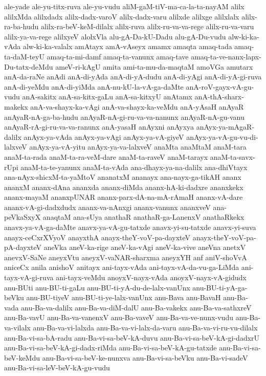 {ale-yade
ale-yu-titx-ruva
ale-yu-vudu
aliM-gaM-tiV-ma-ca-la-ta-nayAM
alilx
alilxMda
alilxdadx
alilx-dadx-varoV
alilx-dadx-varu
alilxde
alilxge
alilxlalx
alilx-ra-ba-hudu
alilx-ra-beV-keM-dilalx
alilx-ruva
alilx-ru-va-va-rege
alilx-ru-va-varu
alilx-ya-va-rege
alilxyeV
alolxVla
alu-gA-Da-kU-Dadu
alu-gA-Du-vudu
alw-ki-ka-vAda
alw-ki-ka-valalx
amAtayx
amA-vAseyx
amamx
amaqta
amaq-tada
amaq-ta-daM-teyU
amaq-ta-mi-damf
amaq-ta-vanunx
amaq-tave
amaq-ta-ve-nanx-lapx-Du-tatx-deMdu
ameV-ri-kAgU
amita
ami-ta-mu-da-maqtaM
amoVGa
amutarx
anA-da-raNe
anAdi
anA-di-yAda
anA-di-yA-dudu
anA-di-yAgi
anA-di-yA-gi-ruva
anA-di-yeMdu
anA-di-yiMda
anA-nu-kU-la-vA-ga-daMte
anA-roV-gayx-vA-gu-vudu
anA-sakitx
anA-sa-kitx-gaLu
anA-sa-kitxyU
anAtamx
anA-thA-sharx-makekx
anA-va-shayx-ka-vAgi
anA-va-shayx-ka-veMdu
anA-yAsaH
anAyaR
anAyaR-nA-ga-ba-hudu
anAyaR-nA-gi-ru-va-va-nanunx
anAyaR-nA-gu-vanu
anAyaR-rA-gi-ru-va-va-ranunx
anA-yasaH
anAyxni
anAyxya
anAyx-ya-mAgaR-dalilx
anAyx-ya-vAda
anAyx-ya-vAgi
anAyx-ya-vA-giyeV
anAyx-ya-vA-gu-vu-di-lalxveV
anAyx-ya-vA-yitu
anAyx-ya-va-lalxveV
anaMta
anaMtaM
anaM-tara
anaM-ta-rada
anaM-ta-ra-veM-dare
anaM-ta-raveV
anaM-tarayx
anaM-ta-savx-rUpi
anaM-ta-te-yanunx
anaM-ta-vAda
ana-dhayx-ya-na-dalilx
ana-dhiVtayx
ana-nAyx-shicxM-ta-yaMtoV
ananatxM
ananayx
ana-nayx-ga-tikAH
ananx
ananxM
ananx-dAna
ananxda
ananx-diMda
ananx-hA-ki-dadxre
ananxkekx
ananx-mayaM
ananxpUNAR
ananx-parx-dA-na-mA-rAmaH
ananx-vA-dare
ananx-vA-gi-dadxdudx
ananx-va-nAnxgi
ananx-vanunx
ananxveV
ana-peVkaSxyX
anaqtaM
ana-sUya
anathaR
anathaR-ga-LanenxV
anathaRkekx
anavx-ya-vA-ga-daMte
anavx-ya-vA-gu-tatxde
anavx-yi-su-tatxde
anavx-yi-suva
anayx-ceCxrXVyoV
anayxthA
anayx-theY-voV-pa-dayxteV
anayx-theY-voV-pa-pA-dayxteV
aneVka
aneV-ka-rige
aneV-ka-vAgi
aneV-ka-vive
aneVna
anetxV
anevxV-SaNe
aneyxVtu
aneyxV-vaNAR-sharxma
aneyxYH
anf
aniV-shoVvA
aniceCx
anila
anishoV
anitayx
ani-tayx-vAda
ani-tayx-vA-da-vu-ga-LiMda
ani-tayx-vA-gi-ruva
ani-tayx-veMdu
anoyxV-nayx-vAda
anoyxV-nayx-vA-gidudx
anu-BUti
anu-BU-ti-gaLu
anu-BU-ti-yA-du-de-lalx-vanUnx
anu-BU-ti-yA-ga-beVku
anu-BU-tiyeV
anu-BU-ti-ye-lalx-vanUnx
anu-Bava
anu-BavaH
anu-Ba-vada
anu-Ba-va-dalilx
anu-Ba-va-diM-dalU
anu-Ba-vakekx
anu-Ba-va-sathxreV
anu-Ba-vavU
anu-Ba-va-vanenxV
anu-Ba-vaveV
anu-Ba-va-ve-nunx-vudu
anu-Ba-va-vilalx
anu-Ba-va-vi-lalxda
anu-Ba-va-vi-lalx-da-varu
anu-Ba-va-vi-ru-vu-dilalx
anu-Ba-vi-sa-bA-radu
anu-Ba-vi-sa-beV-kA-duvu
anu-Ba-vi-sa-beV-kA-gi-dadxrU
anu-Ba-vi-sa-beV-kA-gi-dadx-riMda
anu-Ba-vi-sa-beV-kA-gu-tatxde
anu-Ba-vi-sa-beV-keMdu
anu-Ba-vi-sa-beV-ke-nunxva
anu-Ba-vi-sa-beVku
anu-Ba-vi-sadeV
anu-Ba-vi-sa-leV-beV-kA-gu-vudu
}

